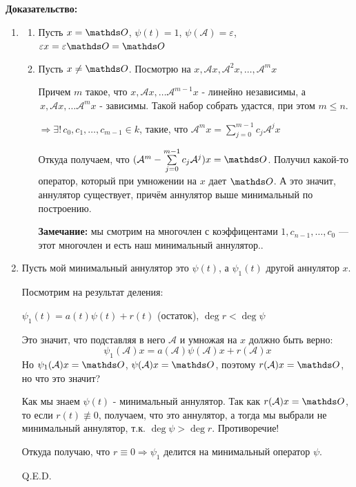 \textbf{Доказательство:}
\begin{enumerate}
    \item 
    \begin{enumerate}
       \item Пусть $x = \zero$, $\psi(t)=1$, $\psi(\mathcal{A})=\varepsilon$,  $\varepsilon x=\varepsilon \zero = \zero$

        \item Пусть $x \ne \zero$. Посмотрю на $x, \mathcal{A}x,\mathcal{A}^2x,\ldots,\mathcal{A}^mx$

       Причем $m$ такое, что $x, \mathcal{A}x, \ldots \mathcal{A}^{m-1}x$ - линейно независимы, а $\, x, \mathcal{A}x, \ldots \mathcal{A}^{m}x$ - зависимы. Такой набор собрать удастся, при этом $m \le n$.

    $\Rightarrow  \exists! \, c_0,c_1,\ldots,c_{m-1} \in k$, такие, что $\mathcal{A}^mx = \sum\limits_{j=0}^{m-1}c_j\mathcal{A}^jx$

     Откуда получаем, что  $(\mathcal{A}^m- \sum\limits_{j=0}^{m-1}c_j\mathcal{A}^j)x= \zero$. Получил какой-то оператор, который при умножении на $x$ дает $\zero$. А это значит, аннулятор существует, причём аннулятор выше минимальный по построению.

     \textbf{Замечание:} мы смотрим на многочлен с коэффицентами $1,c_{n-1},\ldots, c_0$ --- этот многочлен и есть наш минимальный аннулятор..
     
    \end{enumerate}
    \item Пусть мой минимальный аннулятор это $\psi(t)$, а $\psi_1(t)$ другой аннулятор $x$.

    Посмотрим на результат деления:

    $\psi_1(t)=a(t) \psi(t) + r(t)$ (остаток), $\deg r < \deg \psi$

    Это значит, что подставляя в него $\mathcal{A}$ и умножая на $x$ должно быть верно:
    $$\psi_1(\mathcal{A})x = a(\mathcal{A})\psi(\mathcal{A})x+r(\mathcal{A})x$$
    Но $\psi_1(\mathcal{A})x = \zero$, $\psi(\mathcal{A})x = \zero$, поэтому $  r(\mathcal{A})x= \zero$, но что это значит?

    Как мы знаем $\psi(t)$ - минимальный аннулятор. Так как $r(\mathcal{A})x = \zero$, то если $r(t)\not \equiv 0$, получаем, что это аннулятор, а тогда мы выбрали не минимальный аннулятор, т.к. $\deg \psi> \deg r$. Противоречие!

    Откуда получаю, что $r\equiv0 \Rightarrow  \psi_1$ делится на минимальный оператор $\psi$.

    \hfill Q.E.D.

\end{enumerate}



